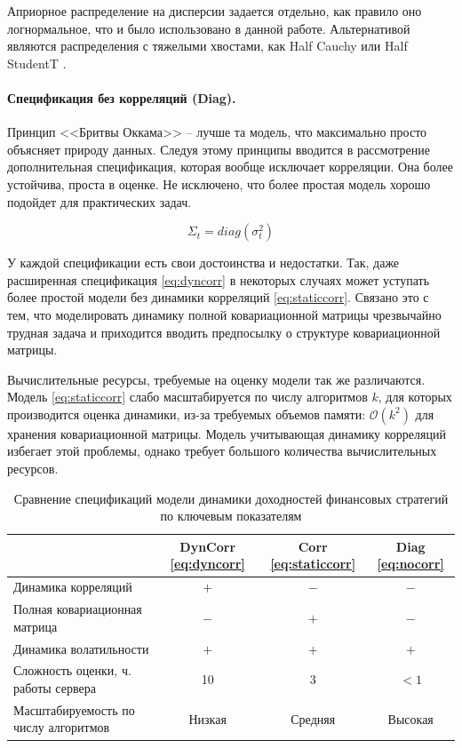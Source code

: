 Априорное распределение на дисперсии задается отдельно, как правило оно логнормальное, что и было использовано в данной работе. Альтернативой являются распределения с тяжелыми хвостами, как Half Cauchy или Half StudentT \citep{gelman2006scale}. 

\paragraph{Спецификация без корреляций (Diag).}
Принцип <<Бритвы Оккама>> -- лучше та модель, что максимально просто объясняет природу данных. Следуя этому принципы вводится в рассмотрение дополнительная спецификация, которая вообще исключает корреляции. Она более устойчива, проста в оценке. Не исключено, что более простая модель хорошо подойдет для практических задач.

\begin{equation}
\Sigma_t = diag(\sigma^2_t)\label{eq:nocorr}
\end{equation}

У каждой спецификации есть свои достоинства и недостатки. Так, даже расширенная спецификация \eqref{eq:dyncorr} в некоторых случаях может уступать более простой модели без динамики корреляций \eqref{eq:staticcorr}. Связано это с тем, что моделировать динамику полной ковариационной матрицы чрезвычайно трудная задача и приходится вводить предпосылку о структуре ковариационной матрицы. 

Вычислительные ресурсы, требуемые на оценку модели так же различаются. Модель \eqref{eq:staticcorr} слабо масштабируется по числу алгоритмов $k$, для которых производится оценка динамики, из-за требуемых объемов памяти: $\mathcal{O}(k^2)$ для хранения ковариационной матрицы. Модель учитывающая динамику корреляций избегает этой проблемы, однако требует большого количества вычислительных ресурсов.
\begin{table}[h]
	\caption{Сравнение спецификаций модели динамики доходностей финансовых стратегий по ключевым показателям}
	\begin{tabular}{l|c|c|c}
		& DynCorr \eqref{eq:dyncorr} & Corr \eqref{eq:staticcorr}& Diag \eqref{eq:nocorr} \\ \hline
		Динамика корреляций & $+$ & $-$ & $-$ \\ \hline
		Полная ковариационная матрица &$-$ & $+$ & $-$ \\ \hline
		Динамика волатильности  &$+$ & $+$ & $+$ \\ \hline
		Сложность оценки, ч. работы сервера &10 & 3 & $<1$ \\ \hline
		Масштабируемость по числу алгоритмов & Низкая & Средняя & Высокая
	\end{tabular}
\end{table}


